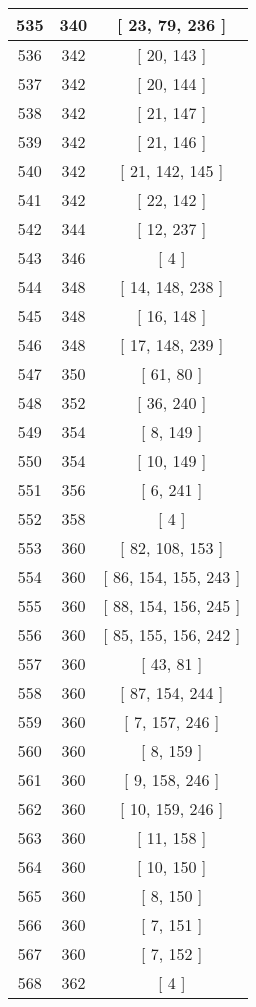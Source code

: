 \begin{center}
\begin{longtable}[H]{|| c c c ||}
\hline
535 & 340 & [ 23, 79, 236 ] \\ 
\hline
536 & 342 & [ 20, 143 ] \\ 
\hline
537 & 342 & [ 20, 144 ] \\ 
\hline
538 & 342 & [ 21, 147 ] \\ 
\hline
539 & 342 & [ 21, 146 ] \\ 
\hline
540 & 342 & [ 21, 142, 145 ] \\ 
\hline
541 & 342 & [ 22, 142 ] \\ 
\hline
542 & 344 & [ 12, 237 ] \\ 
\hline
543 & 346 & [ 4 ] \\ 
\hline
544 & 348 & [ 14, 148, 238 ] \\ 
\hline
545 & 348 & [ 16, 148 ] \\ 
\hline
546 & 348 & [ 17, 148, 239 ] \\ 
\hline
547 & 350 & [ 61, 80 ] \\ 
\hline
548 & 352 & [ 36, 240 ] \\ 
\hline
549 & 354 & [ 8, 149 ] \\ 
\hline
550 & 354 & [ 10, 149 ] \\ 
\hline
551 & 356 & [ 6, 241 ] \\ 
\hline
552 & 358 & [ 4 ] \\ 
\hline
553 & 360 & [ 82, 108, 153 ] \\ 
\hline
554 & 360 & [ 86, 154, 155, 243 ] \\ 
\hline
555 & 360 & [ 88, 154, 156, 245 ] \\ 
\hline
556 & 360 & [ 85, 155, 156, 242 ] \\ 
\hline
557 & 360 & [ 43, 81 ] \\ 
\hline
558 & 360 & [ 87, 154, 244 ] \\ 
\hline
559 & 360 & [ 7, 157, 246 ] \\ 
\hline
560 & 360 & [ 8, 159 ] \\ 
\hline
561 & 360 & [ 9, 158, 246 ] \\ 
\hline
562 & 360 & [ 10, 159, 246 ] \\ 
\hline
563 & 360 & [ 11, 158 ] \\ 
\hline
564 & 360 & [ 10, 150 ] \\ 
\hline
565 & 360 & [ 8, 150 ] \\ 
\hline
566 & 360 & [ 7, 151 ] \\ 
\hline
567 & 360 & [ 7, 152 ] \\ 
\hline
568 & 362 & [ 4 ] \\ 
\hline

\end{longtable}
\end{center}
